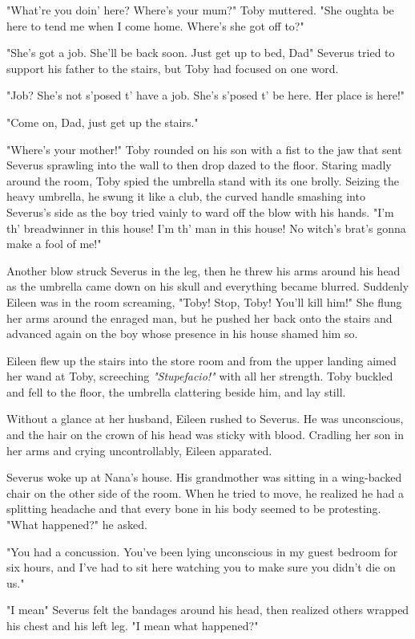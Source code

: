 "What're you doin' here? Where's your mum?" Toby muttered. "She oughta be here to tend me when I come home. Where's she got off to?"

"She's got a job. She'll be back soon. Just get up to bed, Dad{\el}" Severus tried to support his father to the stairs, but Toby had focused on one word.

"Job? She's not s'posed t' have a job. She's s'posed t' be here. Her place is here!"

"Come on, Dad, just get up the stairs."

"Where's your mother!" Toby rounded on his son with a fist to the jaw that sent Severus sprawling into the wall to then drop dazed to the floor. Staring madly around the room, Toby spied the umbrella stand with its one brolly. Seizing the heavy umbrella, he swung it like a club, the curved handle smashing into Severus's side as the boy tried vainly to ward off the blow with his hands. "I'm th' breadwinner in this house! I'm th' man in this house! No witch's brat's gonna make a fool of me!"

Another blow struck Severus in the leg, then he threw his arms around his head as the umbrella came down on his skull and everything became blurred. Suddenly Eileen was in the room screaming, "Toby! Stop, Toby! You'll kill him!" She flung her arms around the enraged man, but he pushed her back onto the stairs and advanced again on the boy whose presence in his house shamed him so.

Eileen flew up the stairs into the store room and from the upper landing aimed her wand at Toby, screeching \emph{"Stupefacio!"} with all her strength. Toby buckled and fell to the floor, the umbrella clattering beside him, and lay still.

Without a glance at her husband, Eileen rushed to Severus. He was unconscious, and the hair on the crown of his head was sticky with blood. Cradling her son in her arms and crying uncontrollably, Eileen apparated.

Severus woke up at Nana's house. His grandmother was sitting in a wing-backed chair on the other side of the room. When he tried to move, he realized he had a splitting headache and that every bone in his body seemed to be protesting. "What happened?" he asked.

"You had a concussion. You've been lying unconscious in my guest bedroom for six hours, and I've had to sit here watching you to make sure you didn't die on us."

"I mean{\el}" Severus felt the bandages around his head, then realized others wrapped his chest and his left leg. "I mean what happened?"

